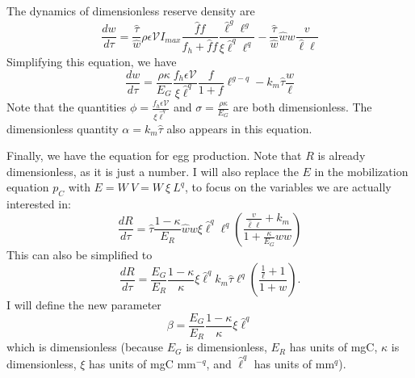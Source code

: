 \documentclass[12pt,reqno,final,pdftex]{amsart}\usepackage[]{graphicx}\usepackage[]{color}
\theoremstyle{plain}
\numberwithin{equation}{part}
\begin{document}
The dynamics of dimensionless reserve density are
\begin{equation}
\frac{dw}{d\tau} = \frac{\hat{\tau}}{\hat{w}} \rho \epsilon \mathcal{V} I_{max} \frac{\hat{f}f}{f_h+\hat{f}f}\frac{\hat{\ell}^g\ell^g}{\xi\hat{\ell}^q\ell^q} - \frac{\hat{\tau}}{\hat{w}}\hat{w}w\frac{v}{\hat{\ell}\ell}
\end{equation}
Simplifying this equation, we have
\begin{equation}
\frac{dw}{d\tau} = \frac{\rho \kappa}{E_G}\frac{f_h \epsilon \mathcal{V}}{\xi \hat{\ell}^q}\frac{f}{1+f}\ell^{g-q}-k_m\hat{\tau} \frac{w}{\ell}
\end{equation}
Note that the quantities $\phi=\frac{f_h \epsilon \mathcal{V}}{\xi \hat{\ell}^q}$ and $\sigma = \frac{\rho \kappa}{E_G}$ are both dimensionless.
The dimensionless quantity $\alpha=k_m\hat{\tau}$ also appears in this equation.

Finally, we have the equation for egg production.
Note that $R$ is already dimensionless, as it is just a number.
I will also replace the $E$ in the mobilization equation $p_C$ with $E=W~V=W~\xi~L^q$, to focus on the variables we are actually interested in:
\begin{equation*}
\frac{dR}{d\tau} = \hat{\tau} \frac{1-\kappa}{E_R} \hat{w}w \xi \hat{\ell}^q\ell^q \left(\frac{\frac{v}{\hat{\ell}\ell} + k_m}{1 + \frac{\kappa}{E_G}\hat{w}w}\right)
\end{equation*}
This can also be simplified to
\begin{equation}
\frac{dR}{d\tau} = \frac{E_G}{E_R}\frac{1-\kappa}{\kappa}\xi\hat{\ell}^q k_m\hat{\tau} \ell^q \left(\frac{\frac{1}{\ell}+1}{1+w}\right).
\end{equation}
I will define the new parameter
\begin{equation}
\beta = \frac{E_G}{E_R}\frac{1-\kappa}{\kappa}\xi\hat{\ell}^q
\end{equation}
which is dimensionless (because $E_G$ is dimensionless, $E_R$ has units of mgC, $\kappa$ is dimensionless, $\xi$ has units of mgC mm$^{-q}$, and $\hat{\ell}^q$ has units of mm$^q$).
\end{document}
